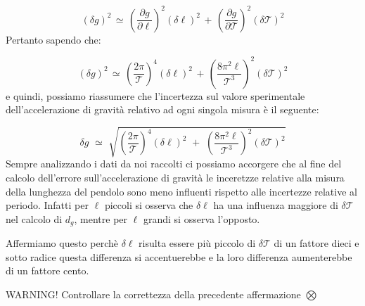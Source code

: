 \begin{equation*}
(\delta g)^2 \, \simeq \, \left( \frac{\partial g}{\partial \ell} \right)^2 (\delta \ell)^2 \, + \, \left( \frac{\partial g}{\partial \mathcal{T}} \right)^2 (\delta \mathcal{T})^2
\end{equation*}
%
Pertanto sapendo che:

\begin{equation*}
(\delta g)^2 \, \simeq \, \left( \frac{2 \pi}{\mathcal{T}} \right)^4 (\delta \ell)^2 \, + \, \left( \frac{8 \pi^2 \ell}{\mathcal{T}^3} \right)^2 (\delta \mathcal{T})^2
\end{equation*}
%
e quindi, possiamo riassumere che l'incertezza sul valore sperimentale dell'accelerazione di gravità relativo ad ogni singola misura è il seguente:

\begin{equation} \label{eq:delta_g}
\delta g \,\, \simeq \,\, \sqrt{\left( \frac{2 \pi}{\mathcal{T}} \right)^4 (\delta \ell)^2 \,\, + \,\, \left( \frac{8 \pi^2 \ell}{\mathcal{T}^3} \right)^2 (\delta \mathcal{T})^2}
\end{equation}
%
Sempre analizzando i dati da noi raccolti ci possiamo accorgere che al fine del calcolo dell'errore sull'accelerazione di gravità le inceretzze relative alla misura della lunghezza del pendolo sono meno influenti rispetto alle incertezze relative al periodo. 
Infatti per $\ell$ piccoli si osserva che $\delta \ell$ ha una influenza maggiore di  $\delta \mathcal{T}$ nel calcolo di $d_g$, mentre per  $\ell$ grandi si osserva l'opposto.


Affermiamo questo perchè $\delta \ell$ risulta essere più piccolo di $\delta \mathcal{T}$ di un fattore dieci e sotto radice questa differenza si accentuerebbe e la loro differenza aumenterebbe di un fattore cento.

WARNING! Controllare la correttezza della precedente affermazione $\bigotimes$

